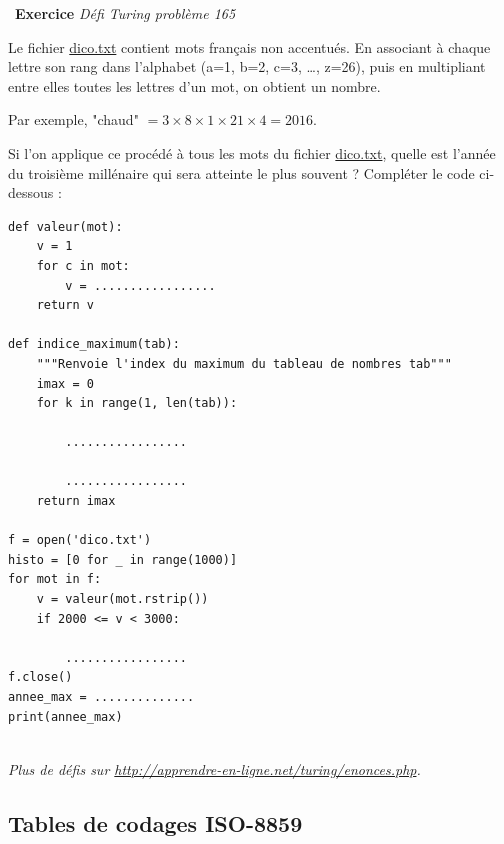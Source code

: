 \documentclass[a4paper, french, 12pt]{article}  %
\newcounter{exo}
\newenvironment{exercice}[1]
{\par \medskip   \addtocounter{exo}{1} \noindent  
\begin{bclogo}[arrondi =0.1,   noborder = true, logo=\bccrayon, marge=4]{~\textbf{Exercice} \textbf{\theexo} {\itshape #1} }  \par}
{
\end{bclogo}
 \par \bigskip }
\newcounter{def}
\newcounter{histo}
\begin{document}
\vspace*{-20pt}

\begin{exercice}{Défi Turing problème 165}
Le fichier \href{ressources/dico.txt}{dico.txt} contient  mots français non accentués. En associant à chaque lettre son rang dans l'alphabet (a=1, b=2, c=3, \ldots, z=26), puis en multipliant entre elles toutes les lettres d'un mot, on obtient un nombre.

Par exemple, "chaud" $= 3 \times 8 \times 1 \times 21 \times 4 = 2016$. 

Si l'on applique ce procédé à tous les mots du fichier \href{ressources/dico.txt}{dico.txt}, quelle est l'année du troisième millénaire qui sera atteinte le plus souvent ? Compléter le code ci-dessous :


\begin{lstlisting}[style=rond]
def valeur(mot):
    v = 1
    for c in mot:
        v = .................
    return v

def indice_maximum(tab):
    """Renvoie l'index du maximum du tableau de nombres tab"""
    imax = 0
    for k in range(1, len(tab)):
    
        .................
        
        .................        
    return imax    
    
f = open('dico.txt')
histo = [0 for _ in range(1000)]
for mot in f:
    v = valeur(mot.rstrip())    
    if 2000 <= v < 3000:
    
        .................
f.close()     
annee_max = ..............
print(annee_max)


\end{lstlisting}
    
    
{\itshape Plus de défis sur \url{http://apprendre-en-ligne.net/turing/enonces.php}.}

\end{exercice}

\vspace*{-20pt}

\subsection{Tables de codages ISO-8859}

\vspace*{-20pt}
\end{document}
